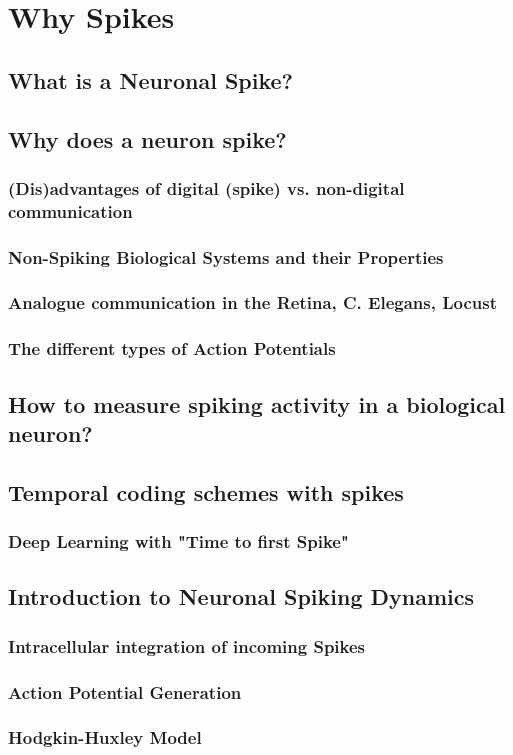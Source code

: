 \documentclass[main]{subfiles}
\begin{document}
\newpage
\section{Why Spikes}
\subsection{What is a Neuronal Spike?}

\subsection{Why does a neuron spike?}
\subsubsection{(Dis)advantages of digital (spike) vs. non-digital communication}
\subsubsection{Non-Spiking Biological Systems and their Properties}
\subsubsection{Analogue communication in the Retina, C. Elegans, Locust}
\subsubsection{The different types of Action Potentials}


\subsection{How to measure spiking activity in a biological neuron?}

\subsection{Temporal coding schemes with spikes}
\subsubsection{Deep Learning with "Time to first Spike"}

\subsection{Introduction to Neuronal Spiking Dynamics}
\subsubsection{Intracellular integration of incoming Spikes}
\subsubsection{Action Potential Generation}
\subsubsection{Hodgkin-Huxley Model}
\end{document}
